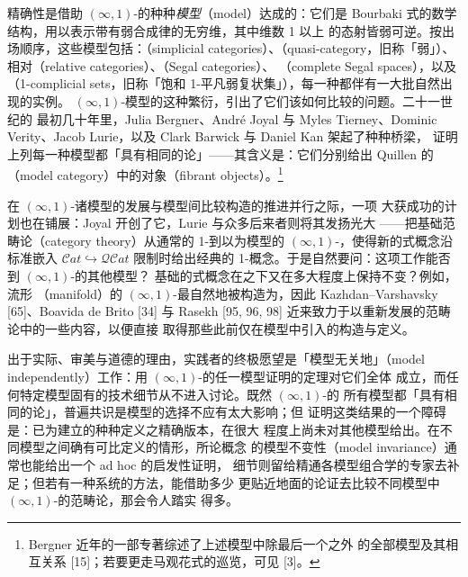 精确性是借助 $(\infty,1)$-\trCategory{}的种种\emph{模型}（model）达成的：它们是
Bourbaki 式的数学结构，用以表示带有弱合成律的无穷维\trCategory{}，其中维数 1 以上
的态射皆弱可逆。按出场顺序，这些模型包括：\trSimplicialCategory{}（simplicial
categories）、\textbf{\trQuasiCategory}（quasi-category，旧称「弱\trKanComplex{}」）、
相对\trCategory{}（relative categories）、\trSegalCategories{}（Segal categories）、
\trCompleteSegalSpaces{}（complete Segal spaces），以及\trOneComplicialSets{}（1-complicial
sets，旧称「饱和 1-平凡弱复状集」），每一种都伴有一大批自然出现的实例。
$(\infty,1)$-\trCategory{}模型的这种繁衍，引出了它们该如何比较的问题。二十一世纪的
最初几十年里，Julia Bergner、André Joyal 与 Myles Tierney、Dominic Verity、Jacob Lurie，以及 Clark Barwick 与 Daniel Kan 架起了种种桥梁，
证明上列每一种模型都「具有相同的\trHomotopy{}论」——其含义是：它们分别给出 Quillen
\trEquivalence{}的\textbf{\trModelCategory}（model category）中的\trFibrant{}对象（fibrant
objects）。\footnote{Bergner 近年的一部专著综述了上述模型中除最后一个之外
的全部模型及其相互关系 [15]；若要更走马观花式的巡览，可见 [3]。}

在 $(\infty,1)$-\trCategory{}诸模型的发展与模型间比较构造的推进并行之际，一项
大获成功的计划也在铺展：Joyal 开创了它，Lurie 与众多后来者则将其发扬光大
——把基础范畴论（category theory）从通常的 1-\trCategory\trExtension{}到以\trQuasiCategory{}为模型的
$(\infty,1)$-\trCategory{}，使得新的\trQuasiCategory{}式概念沿标准嵌入
$\mathcal{C}at\hookrightarrow\mathcal{Q}\mathcal{C}at$ 限制时给出经典的
1-\trCategory{}概念。于是自然要问：这项工作能否\trExtension{}到 $(\infty,1)$-\trCategory{}的其他模型？
基础的\trInfinityCategory{}式概念在\trChangeOfModel{}之下又在多大程度上保持不变？例如，流形
（manifold）的 $(\infty,1)$-\trCategory{}最自然地被构造为\trCompleteSegalSpaces{}，因此
Kazhdan–Varshavsky [65]、Boavida de Brito [34] 与 Rasekh [95, 96, 98]
近来致力于以\trCompleteSegalSpaces{}重新发展\trQuasiCategory{}的范畴论中的一些内容，以便直接
取得那些此前仅在\trQuasiCategory{}模型中引入的构造与定义。

出于实际、审美与道德的理由，实践者的终极愿望是「模型无关地」（model
independently）工作：用 $(\infty,1)$-\trCategory{}的任一模型证明的定理对它们全体
成立，而任何特定模型固有的技术细节从不进入讨论。既然 $(\infty,1)$-\trCategory{}的
所有模型都「具有相同的\trHomotopy{}论」，普遍共识是模型的选择不应有太大影响；但
证明这类结果的一个障碍是：已为\trQuasiCategory{}建立的种种\trCategory{}定义之精确版本，在很大
程度上尚未对其他模型给出。在不同模型之间确有可比定义的情形，所论\trCategory{}概念
的模型不变性（model invariance）通常也能给出一个 ad hoc 的启发性证明，
细节则留给精通各模型组合学的专家去补足；但若有一种系统的方法，能借助多少
更贴近地面的论证去比较不同模型中 $(\infty,1)$-\trCategory{}的范畴论，那会令人踏实
得多。
